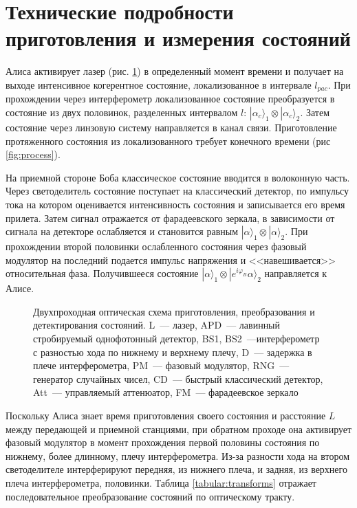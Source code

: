 \section[Технические подробности]{Технические подробности приготовления и измерения состояний}
Алиса активирует лазер (рис. \ref{fig:scheme}) в определенный момент времени и получает на выходе интенсивное когерентное состояние, локализованное в интервале $l_{pac}$. 
При прохождении через интерферометр локализованное состояние преобразуется в состояние из двух половинок, разделенных интервалом $l$: $|\alpha_c\rangle_1 \otimes |\alpha_c\rangle_2$. 
Затем состояние через линзовую систему направляется в канал связи. Приготовление протяженного состояния из локализованного требует конечного времени (рис \ref{fig:process}).

На приемной стороне Боба классическое состояние вводится в волоконную часть. 
Через светоделитель состояние поступает на классический детектор, по импульсу тока на котором оценивается интенсивность состояния и записывается его время прилета. 
Затем сигнал отражается от фарадеевского зеркала, в зависимости от сигнала на детекторе ослабляется и становится равным $|\alpha\rangle_1 \otimes |\alpha\rangle_2$.
При прохождении второй половинки ослабленного состояния через фазовый модулятор на последний подается импульс напряжения и <<навешивается>> относительная фаза.
Получившееся состояние $|\alpha\rangle_1 \otimes |e^{i\varphi_B}\alpha\rangle_2$ направляется к Алисе.

\begin{figure}[h]
\caption{
Двухпроходная оптическая схема приготовления, преобразования и детектирования состояний.
L~--- лазер, APD~--- лавинный стробируемый однофотонный детектор, BS1, BS2~---интерферометр с разностью хода по нижнему и верхнему плечу,
D~--- задержка в плече интерферометра, PM~--- фазовый модулятор, RNG~--- генератор случайных чисел,
CD~--- быстрый классический детектор, Att~--- управляемый аттенюатор, FM~--- фарадеевское зеркало
}
\label{fig:scheme}
\end{figure}

Поскольку Алиса знает время приготовления своего состояния и расстояние $L$ между передающей и приемной станциями, при обратном проходе она активирует фазовый модулятор в момент прохождения первой половины состояния по нижнему, более длинному, плечу интерферометра. 
Из-за разности хода на втором светоделителе интерферируют передняя, из нижнего плеча, и задняя, из верхнего плеча интерферометра, половинки.
Таблица \ref{tabular:transforms} отражает последовательное преобразование состояний по оптическому тракту.

